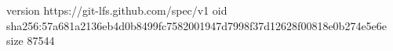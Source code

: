 version https://git-lfs.github.com/spec/v1
oid sha256:57a681a2136eb4d0b8499fc7582001947d7998f37d12628f00818e0b274e5e6e
size 87544
